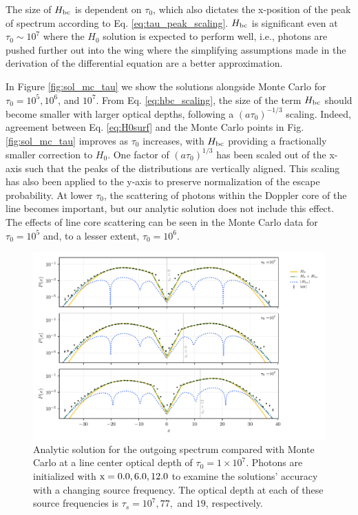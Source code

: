 \documentclass{aastex63}
\begin{document}
The size of $H_{\rm bc}$ is dependent on $\tau_0$, which also dictates the x-position of the peak of spectrum according to Eq. \ref{eq:tau_peak_scaling}. $H_{\rm bc}$ is significant even at $\tau_0 {\sim} 10^7$ where the $H_0$ solution is expected to perform well, i.e., photons are pushed further out into the wing where the simplifying assumptions made in the derivation of the differential equation are a better approximation. 

In Figure \ref{fig:sol_mc_tau} we show the solutions alongside Monte Carlo for $\tau_0=10^5, 10^6$, and $10^7$. From Eq. \ref{eq:hbc_scaling}, the size of the term $H_{\rm bc}$ should become smaller with larger optical depths, following a $(a\tau_0)^{-1/3}$ scaling. Indeed, agreement between Eq. \ref{eq:H0surf} and the Monte Carlo points in Fig. \ref{fig:sol_mc_tau} improves as $\tau_0$ increases, with $H_{\rm bc}$ providing a fractionally smaller correction to $H_0$. One factor of $(a\tau_0)^{1/3}$ has been scaled out of the x-axis such that the peaks of the distributions are vertically aligned. This scaling has also been applied to the y-axis to preserve normalization of the escape probability. At lower $\tau_0$, the scattering of photons within the Doppler core of the line becomes important, but our analytic solution does not include this effect. The effects of line core scattering can be seen in the Monte Carlo data for $\tau_0=10^5$ and, to a lesser extent, $
\tau_0=10^6$.
 
 \begin{figure}
    \centering
    \includegraphics{xinit_threepanel.pdf}
    \caption{Analytic solution for the outgoing spectrum compared with Monte Carlo at a line center optical depth of $\tau_0 = 1 \times 10^7$. Photons are initialized with $\rm x = 0.0, 6.0, 12.0$ to examine the solutions' accuracy with a changing source frequency. The optical depth at each of these source frequencies is $\tau_s = 10^7, 77,$ and $19$, respectively.} 
    \label{fig:sol_mc_xinit}
\end{figure}
\end{document}
